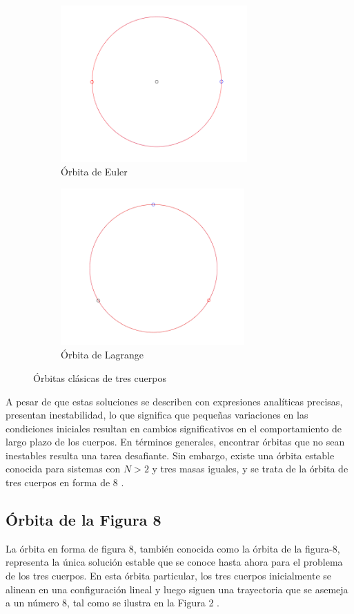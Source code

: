 \documentclass{article}
\begin{document}
\begin{figure}[h]

\begin{subfigure}{0.5\textwidth}
\includegraphics[width=0.9\linewidth, height=6cm]{img/EulerOrbit.png} 
\caption{Órbita de Euler}
\label{fig:subim1}
\end{subfigure} 
\begin{subfigure}{0.5\textwidth}
\includegraphics[width=0.9\linewidth, height=6cm]{img/LagrangeOrbit.png}
\caption{Órbita de Lagrange}
\label{fig:orbit1}
\end{subfigure}

\caption{Órbitas clásicas de tres cuerpos}
\label{fig:image2}
\end{figure}


A pesar de que estas soluciones se describen con expresiones 
analíticas precisas, presentan inestabilidad, lo 
que significa que pequeñas variaciones en las 
condiciones iniciales resultan en cambios 
significativos en el comportamiento de largo 
plazo de los cuerpos. En términos generales, 
encontrar órbitas que no sean inestables resulta 
una tarea desafiante. Sin embargo, existe una 
órbita estable conocida para sistemas con $N > 2$ 
y tres masas iguales, y se trata de la 
órbita de tres cuerpos en forma de 8 \cite{montgomery2001new}.

\subsection{Órbita de la Figura 8}
La órbita en forma de figura 8, también conocida como la órbita 
de la figura-8, representa la única solución estable que se 
conoce hasta ahora para el problema de los tres cuerpos. 
En esta órbita particular, los tres cuerpos inicialmente 
se alinean en una configuración lineal y luego siguen 
una trayectoria que se asemeja a un número 8, tal 
como se ilustra en la Figura 2 \cite{montgomery2001new}.
\end{document}
